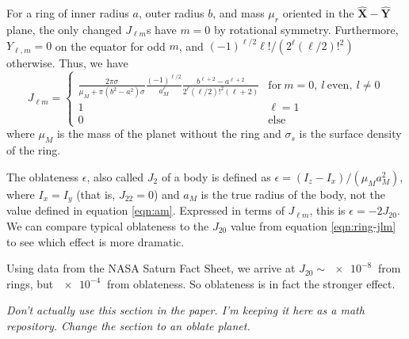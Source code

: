 \documentclass[11pt]{article}
\newcommand{\unit}[1]{\hat{\mathbf{#1}}}
\newcommand{\jtd}[1]{{\color{red}\textit{#1}}}
\begin{document}
For a ring of inner radius $a$, outer radius $b$, and mass $\mu_r$ oriented in the $\unit X-\unit Y$ plane, the only changed $J_{\ell m}$s have $m = 0$ by rotational symmetry. Furthermore, $Y_{\ell, m} = 0$ on the equator for odd $m$, and $(-1)^{\ell/2} \ell! / (2^\ell (\ell/2)!^2)$ otherwise. Thus, we have
\begin{equation}
J_{\ell m} = \begin{cases}
\frac{2 \pi \sigma}{\mu_M + \pi(b^2-a^2)\sigma}\frac{(-1)^{\ell/2}}{a_M^\ell}\frac{b^{\ell+2} - a^{\ell+2}}{2^\ell (\ell/2)!^2 (\ell + 2)}
 & \text{for}\ m = 0,\ l\ \text{even},\ l \neq 0\\
1 & \ell = 1\\
0 & \text{else}
\end{cases}
\label{eqn:ring-jlm}
\end{equation}
where $\mu_M$ is the mass of the planet without the ring and $\sigma_s$ is the surface density of the ring.


The oblateness $\epsilon$, also called $J_2$ of a body is defined as $\epsilon = (I_z - I_x)/(\mu_M a_M^2)$, where $I_x = I_y$ (that is, $J_{22} = 0$) and $a_M$ is the true radius of the body, not the value defined in equation \ref{eqn:am}. Expressed in terms of $J_{\ell m}$, this is $\epsilon = -2J_{20}$. We can compare typical oblateness to the $J_{20}$ value from equation \ref{eqn:ring-jlm} to see which effect is more dramatic.

Using data from the NASA Saturn Fact Sheet, we arrive at $J_{20}\sim \SI{e-8}{}$ from rings, but $\SI{e-4}{}$ from oblateness. So oblateness is in fact the stronger effect.

\jtd{Don't actually use this section in the paper. I'm keeping it here as a math repository. Change the section to an oblate planet.}
\end{document}

